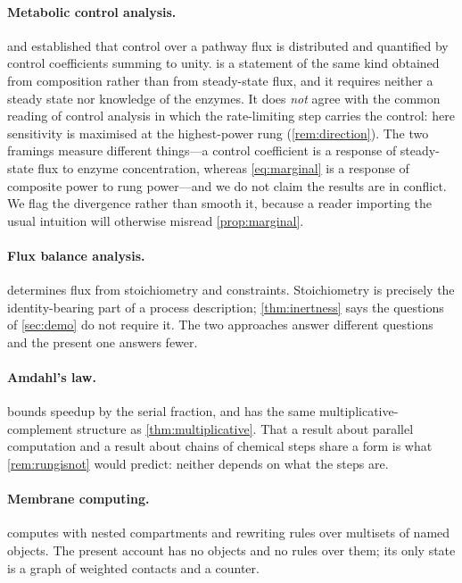 \documentclass[11pt,twocolumn,a4paper]{article}
\theoremstyle{plain}
\theoremstyle{definition}
\theoremstyle{remark}
\begin{document}
\paragraph{Metabolic control analysis.}  and
\citet{heinrich1974} established that control over a pathway flux is distributed
and quantified by control coefficients summing to unity.
 is a statement of the same kind obtained from composition
rather than from steady-state flux, and it requires neither a steady state nor
knowledge of the enzymes. It does \emph{not} agree with the common reading of
control analysis in which the rate-limiting step carries the control: here
sensitivity is maximised at the highest-power rung (\cref{rem:direction}). The
two framings measure different things---a control coefficient is a response of
steady-state flux to enzyme concentration, whereas \cref{eq:marginal} is a
response of composite power to rung power---and we do not claim the results are
in conflict. We flag the divergence rather than smooth it, because a reader
importing the usual intuition will otherwise misread \cref{prop:marginal}.

\paragraph{Flux balance analysis.}  determines flux from
stoichiometry and constraints. Stoichiometry is precisely the identity-bearing
part of a process description; \cref{thm:inertness} says the questions of
\cref{sec:demo} do not require it. The two approaches answer different
questions and the present one answers fewer.

\paragraph{Amdahl's law.}  bounds speedup by the serial
fraction, and has the same multiplicative-complement structure as
\cref{thm:multiplicative}. That a result about parallel computation and a result
about chains of chemical steps share a form is what \cref{rem:rungisnot} would
predict: neither depends on what the steps are.

\paragraph{Membrane computing.}  computes with nested
compartments and rewriting rules over multisets of named objects. The present
account has no objects and no rules over them; its only state is a graph of
weighted contacts and a counter.
\end{document}
